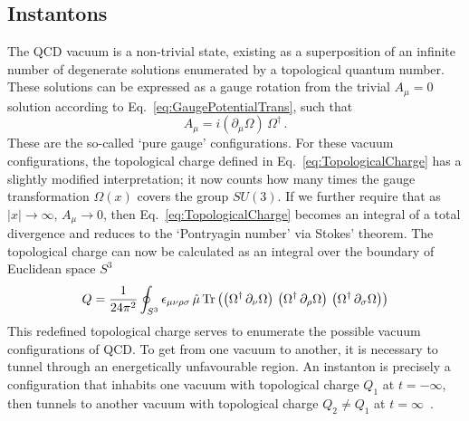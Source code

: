 \subsection{Instantons}\label{sec:Instantons}
The QCD vacuum is a non-trivial state, existing as a superposition of an infinite number of degenerate solutions enumerated by a topological quantum number. These solutions can be expressed as a gauge rotation from the trivial $A_\mu=0$ solution according to Eq.~\eqref{eq:GaugePotentialTrans}, such that
%
\begin{equation}
A_\mu = i(\partial_\mu \Omega)\,\Omega^\dagger\, .
\end{equation}
%
These are the so-called `pure gauge' configurations. For these vacuum configurations, the topological charge defined in Eq.~\eqref{eq:TopologicalCharge} has a slightly modified interpretation; it now counts how many times the gauge transformation $\Omega(x)$ covers the group $SU(3)$. If we further require that as $|x|\rightarrow \infty$, $A_\mu\rightarrow 0$, then  Eq.~\eqref{eq:TopologicalCharge} becomes an integral of a total divergence and reduces to the `Pontryagin number' via Stokes' theorem. The topological charge can now be calculated as an integral over the boundary of Euclidean space $S^3$~\cite{ryder1996quantum}
%
\begin{equation}
Q = \frac{1}{24\pi^2}\oint_{S^3} \epsilon_{\mu\nu\rho\sigma} \, \hat{\mu}\operatorname{Tr}\left(\left(\Omega^\dagger \,\partial_\nu \Omega\right)\,\left(\Omega^\dagger \,\partial_\rho \Omega\right)\,\left(\Omega^\dagger \,\partial_\sigma \Omega\right)\right)
\end{equation}
%
This redefined topological charge serves to enumerate the possible vacuum configurations of QCD. To get from one vacuum to another, it is necessary to tunnel through an energetically unfavourable region. An instanton is precisely a configuration that inhabits one vacuum with topological charge $Q_1$ at $t=-\infty$, then tunnels to another vacuum with topological charge $Q_2\neq Q_1$ at $t=\infty$~\cite{Schafer:1996wv}.\\

